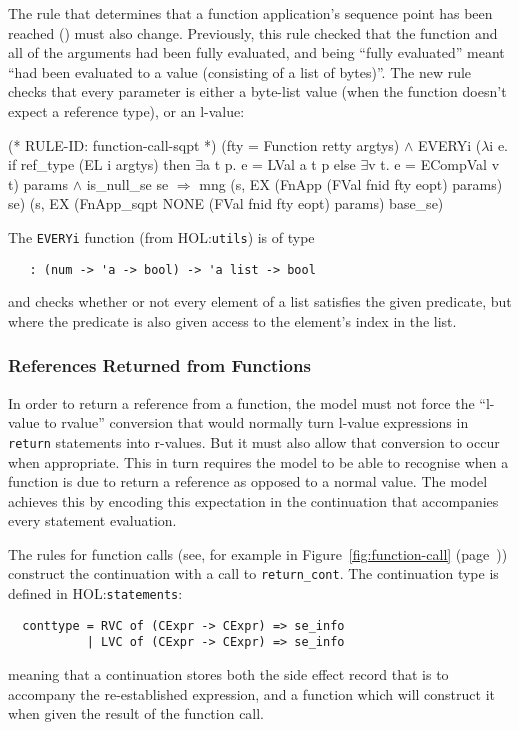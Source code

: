 \documentclass[11pt]{article}
\newcommand{\HOLfile}[1]{HOL:\texttt{#1}}
\begin{document}
The rule that determines that a function application's sequence point
has been reached () must also change.
Previously, this rule checked that the function and all of the
arguments had been fully evaluated, and being ``fully evaluated''
meant ``had been evaluated to a value (consisting of a list of
bytes)''.  The new rule checks that every parameter is either a
byte-list value (when the function doesn't expect a reference type),
or an l-value:
%
\begin{stdrule}
(* RULE-ID: function-call-sqpt *)
     (fty = Function retty argtys) \(\land\)
     EVERYi (\(\lambda\)i e. if ref_type (EL i argtys) then
                     \(\exists\)a t p. e = LVal a t p
                   else \(\exists\)v t. e = ECompVal v t)
            params \(\land\)
     is_null_se se
   \(\Rightarrow\)
     mng (s, EX (FnApp (FVal fnid fty eopt) params) se)
         (s, EX (FnApp_sqpt NONE (FVal fnid fty eopt) params)
                base_se)
\end{stdrule}
The \texttt{EVERYi} function (from \HOLfile{utils}) is of type
\begin{verbatim}
   : (num -> 'a -> bool) -> 'a list -> bool
\end{verbatim}
and checks whether or not every element of a list satisfies the given
predicate, but where the predicate is also given access to the
element's index in the list.

\subsubsection{References Returned from Functions}
\label{sec:refs-returned-from-fns}

In order to return a reference from a function, the model must not
force the ``l-value to rvalue'' conversion that would normally turn
l-value expressions in \texttt{return} statements into r-values.  But
it must also allow that conversion to occur when appropriate.  This in
turn requires the model to be able to recognise when a function is due
to return a reference as opposed to a normal value.  The model
achieves this by encoding this expectation in the continuation that
accompanies every statement evaluation.

%
The rules for function calls (see, for example 
in Figure~\ref{fig:function-call} (page~\pageref{fig:function-call}))
construct the continuation with a call to \texttt{return_cont}.  The
continuation type is defined in \HOLfile{statements}:
\begin{verbatim}
  conttype = RVC of (CExpr -> CExpr) => se_info
           | LVC of (CExpr -> CExpr) => se_info
\end{verbatim}
meaning that a continuation stores both the side effect record that is
to accompany the re-established expression, and a function which will
construct it when given the result of the function call.
\end{document}
